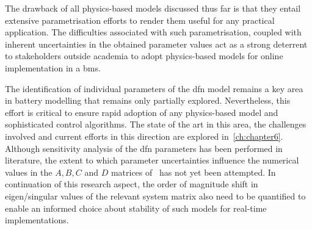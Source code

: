 
The drawback of all physics-based models  discussed thus far is that they entail
extensive parametrisation  efforts   to render  them useful for  any practical
application. The difficulties associated with such parametrisation, coupled with
inherent  uncertainties  in  the  obtained  parameter values  act  as  a  strong
deterrent to  stakeholders outside  academia to  adopt physics-based  models for
online implementation in a \gls{bms}.




 The  identification of  individual parameters  of the  \gls{dfn}
model  remains a  key  area in  battery modelling  that  remains only  partially
explored. Nevertheless, this effort is critical  to ensure rapid adoption of any
physics-based model and  sophisticated control algorithms. The state  of the art
in this area, the challenges involved  and current efforts in this direction are
explored in~\cref{ch:chapter6}.  Although sensitivity analysis of  the \gls{dfn}
parameters has been performed in  literature,  the extent to
which  parameter uncertainties  influence the  numerical  values in  the $A,  B,
C$  and  $D$  matrices  of~ has  not  yet  been  attempted.
In  continuation of  this  research  aspect, the  order  of  magnitude shift  in
eigen/singular values of  the relevant system matrix also need  to be quantified
to  enable an  informed  choice about  stability of  such  models for  real-time
implementations.










